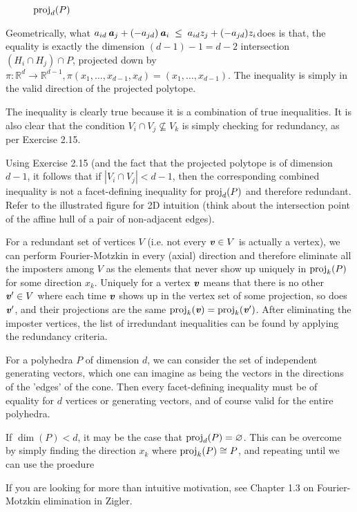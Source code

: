 \documentclass{article}
\begin{document}
\begin{enumerate}
\begin{solution}
\begin{figure}[h]
\caption{$\operatorname{proj}_d(P)$}
\end{figure}

    Geometrically, what $a_{id}\,\textbf{\textit{a}}_j + (-a_{jd})\,\textbf{\textit{a}}_i \;\le\; a_{id} z_j + (-a_{jd}) z_i$does is that, the equality is exactly the dimension $(d-1)-1 = d-2$ intersection $(H_i \cap H_j) \cap P$, projected down by $\pi: \mathbb{R}^d \to \mathbb{R}^{d-1}, \pi(x_1, \ldots, x_{d-1},  x_d) = (x_1, \ldots, x_{d-1})$. The inequality is simply in the valid direction of the projected polytope.

    The inequality is clearly true because it is a combination of true inequalities. It is also clear that the condition $V_i \cap V_j \nsubseteq V_k$ is simply checking for redundancy, as per Exercise 2.15. 

    Using Exercise 2.15 (and the fact that the projected polytope is of dimension $d-1$, it follows that if $|V_i \cap V_j| < d-1$, then the corresponding combined inequality is not a facet-defining inequality for $\operatorname{proj}_d(P)$ and therefore redundant. Refer to the illustrated figure for 2D intuition (think about the intersection point of the affine hull of a pair of non-adjacent edges).

    For a redundant set of vertices $V$ (i.e. not every $\textbf{\textit{v}} \in V$ is actually a vertex), we can perform Fourier-Motzkin in every (axial) direction and therefore eliminate all the imposters among $V$ as the elements that never show up uniquely in $\operatorname{proj}_k(P)$ for some direction $x_k$. Uniquely for a vertex $\textbf{\textit{v}}$ means that there is no other $\textbf{\textit{v}}' \in V$ where each time $\textbf{\textit{v}}$ shows up in the vertex set of some projection, so does $\textbf{\textit{v}}'$, and their projections are the same $\operatorname{proj}_k(\textbf{\textit{v}}) = \operatorname{proj}_k(\textbf{\textit{v}}')$. After eliminating the imposter vertices, the list of irredundant inequalities can be found by applying the redundancy criteria.

    For a polyhedra $P$ of dimension $d$, we can consider the set of independent generating vectors, which one can imagine as being the vectors in the directions of the 'edges' of the cone. Then every facet-defining inequality must be of equality for $d$ vertices or generating vectors, and of course valid for the entire polyhedra.

    If $\dim(P) < d$, it may be the case that $\operatorname{proj}_d(P) = \varnothing$. This can be overcome by simply finding the direction $x_k$ where $\operatorname{proj}_k(P) \cong P$, and repeating until we can use the proedure
\begin{remark}
    If you are looking for more than intuitive motivation, see Chapter 1.3 on Fourier-Motzkin elimination in Zigler.
\end{remark}
\end{solution}


\end{enumerate}
\end{document}
